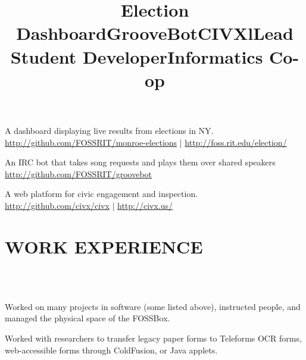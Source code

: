 \documentclass[line]{res}
\begin{document}
\begin{resume}
    \title{Election Dashboard}
    \begin{position}
        A dashboard displaying live results from elections in NY.\\
        \url{http://github.com/FOSSRIT/monroe-elections} | \url{http://foss.rit.edu/election/}
    \end{position}

    \title{GrooveBot}
    \begin{position}
        An IRC bot that takes song requests and plays them over shared speakers\\
        \url{http://github.com/FOSSRIT/groovebot}
    \end{position}

    \title{CIVX}
    \begin{position}
        A web platform for civic engagement and inspection.\\
        \url{http://github.com/civx/civx} | \url{http://civx.us/}
    \end{position}

\section{WORK EXPERIENCE}
    \begin{format}
        \title{l}\\
        \\
        \body
    \end{format}

    \title{Lead Student Developer}
    \begin{position}
        Worked on many projects in software (some listed above), instructed
        people, and managed the physical space of the FOSSBox.
    \end{position}

    \title{Informatics Co-op}
    \begin{position}
        Worked with researchers to transfer legacy paper forms to Teleforms OCR
        forms, web-accessible forms through ColdFusion, or Java applets.
    \end{position}


\end{resume}
\end{document}
